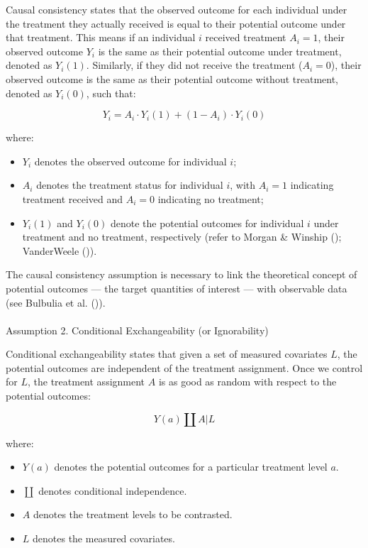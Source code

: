 \documentclass[
  single column]{article}
\makeatletter
\let\oldparagraph\paragraph
\renewcommand{\paragraph}{
    \@ifstar
      \xxxParagraphStar
      \xxxParagraphNoStar
  }
\newcommand{\xxxParagraphStar}[1]{\oldparagraph*{#1}\mbox{}}
\newcommand{\xxxParagraphNoStar}[1]{\oldparagraph{#1}\mbox{}}
\providecommand{\tightlist}{%
  \setlength{\itemsep}{0pt}\setlength{\parskip}{0pt}}\usepackage{longtable,booktabs,array}
\makeatother
\begin{document}
Causal consistency states that the observed outcome for each individual
under the treatment they actually received is equal to their potential
outcome under that treatment. This means if an individual \(i\) received
treatment \(A_i = 1\), their observed outcome \(Y_i\) is the same as
their potential outcome under treatment, denoted as \(Y_i(1)\).
Similarly, if they did not receive the treatment (\(A_i = 0\)), their
observed outcome is the same as their potential outcome without
treatment, denoted as \(Y_i(0)\), such that:

\[
Y_i = A_i \cdot Y_i(1) + (1 - A_i) \cdot Y_i(0)
\]

where:

\begin{itemize}
\tightlist
\item
  \(Y_i\) denotes the observed outcome for individual \(i\);
\item
  \(A_i\) denotes the treatment status for individual \(i\), with
  \(A_i = 1\) indicating treatment received and \(A_i = 0\) indicating
  no treatment;
\item
  \(Y_i(1)\) and \(Y_i(0)\) denote the potential outcomes for individual
  \(i\) under treatment and no treatment, respectively (refer to Morgan
  \& Winship (); VanderWeele
  ()).
\end{itemize}

The causal consistency assumption is necessary to link the theoretical
concept of potential outcomes --- the target quantities of interest ---
with observable data (see Bulbulia et al.
()).

\paragraph{Assumption 2. Conditional Exchangeability (or
Ignorability)}\label{assumption-2.-conditional-exchangeability-or-ignorability}

Conditional exchangeability states that given a set of measured
covariates \(L\), the potential outcomes are independent of the
treatment assignment. Once we control for \(L\), the treatment
assignment \(A\) is as good as random with respect to the potential
outcomes:

\[
Y(a) \coprod A | L
\]

where:

\begin{itemize}
\tightlist
\item
  \(Y(a)\) denotes the potential outcomes for a particular treatment
  level \(a\).
\item
  \(\coprod\) denotes conditional independence.
\item
  \(A\) denotes the treatment levels to be contrasted.
\item
  \(L\) denotes the measured covariates.
\end{itemize}
\end{document}
